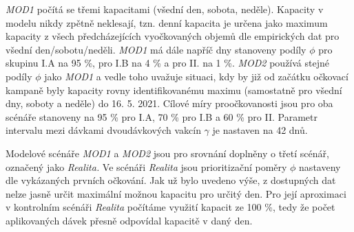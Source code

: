 \emph{MOD1} počítá se třemi kapacitami (všední den, sobota, neděle). Kapacity v modelu nikdy zpětně neklesají, tzn. denní kapacita je určena jako maximum kapacity z %
všech předcházejících vyočkovaných objemů dle empirických dat pro všední den/sobotu/neděli. \emph{MOD1} má dále napříč dny stanoveny podíly $\phi$ pro skupinu I.A na 95 \%, pro I.B na 4 \% a pro II. na 1 \%.
%
\emph{MOD2} používá stejné podíly  $\phi$ jako \emph{MOD1} a vedle toho uvažuje situaci, kdy by již od začátku očkovací kampaně byly kapacity rovny identifikovanému maximu (samostatně pro všední dny, soboty a neděle) do 16. 5. 2021. 
%
Cílové míry proočkovanosti jsou pro oba scénáře stanoveny na 95 \% pro I.A, 70 \% pro I.B a 60 \% pro II. Parametr intervalu mezi dávkami dvoudávkových vakcín $\gamma$ je nastaven na 42 dnů.


Modelové scénáře \emph{MOD1} a \emph{MOD2} jsou pro srovnání doplněny o třetí scénář, označený jako \emph{Realita.}  Ve scénáři \emph{Realita} jsou prioritizační poměry $\phi$ nastaveny dle vykázaných prvních očkování. Jak už bylo uvedeno výše, z dostupných dat nelze jasně určit maximální možnou kapacitu pro určitý den. Pro její aproximaci v kontrolním scénáři \emph{Realita} počítáme využití kapacit ze 100 \%, tedy že počet aplikovaných dávek přesně odpovídal kapacitě v daný den.




%



